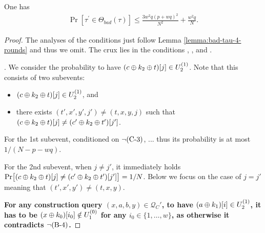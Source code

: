 \begin{lemma}
	\label{lemma:bad-tau-6-rounds}
	
	One has
	\begin{align}
	\operatorname{Pr}[\tau^{\prime} \in \Theta_{bad}(\tau)] \leq \frac{3w^{2} q \left(p+w q\right)^{2}}{N^{2}} + \frac{w^{2} q}{N}.
	\label{eq:bound-bad-tau-6-rounds}
	\end{align}
\end{lemma}
\begin{proof}
The analyses of the conditions just follow Lemma \ref{lemma:bad-tau-4-rounds} and thus we omit. The crux lies in the conditions \cfour, \cfive, and \csix.




\arrangespace

\noindent \textsc{\cfour}. We consider the probability to have $(c\oplus k_2\oplus t)[j]\in U_2^{(1)}$. Note that this consists of two subevents:
\begin{itemize}
	\item $(c\oplus k_2\oplus t)[j]\in U_2^{(1)}$, and
	\item there exists $(t',x',y',j')\neq(t,x,y,j)$ such that $(c\oplus k_2\oplus t)[j]\neq(c'\oplus k_2\oplus t')[j']$.
\end{itemize}
For the 1st subevent, conditioned on $\neg\text{(C-3)}$, ... thus its probability is at most $1/(N-p-wq)$.


For the 2nd subevent, when $j\neq j'$, it immediately holds ${\Pr}\big[(c\oplus k_2\oplus t)[j]\neq(c'\oplus k_2\oplus t')[j']\big]=1/N$. Below we focus on the case of $j=j'$ meaning that $(t',x',y')\neq(t,x,y)$.




\textbf{For any construction query $(x,a,b,y)\in\mathcal{Q}_C'$, to have $(a\oplus k_1)[i]\in U_2^{(1)}$, it has to be $(x\oplus k_0)[i_0]\notin U_1^{(0)}$ for any $i_0\in\{1,\ldots,w\}$, as otherwise it contradicts $\neg\text{(B-4)}$.}



\end{proof}

